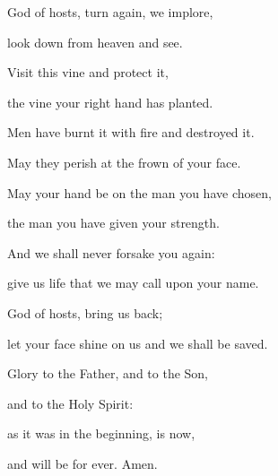 \noindent God of hosts, turn again, we implore,~\GreStar{}~\nopagebreak

look down from heaven and see.

\noindent Visit this vine and protect it,~\GreStar{}~\nopagebreak

the vine your right hand has planted.

\noindent Men have burnt it with fire and destroyed it.~\GreStar{}~\nopagebreak

May they perish at the frown of your face.

\noindent May your hand be on the man you have chosen,~\GreStar{}~\nopagebreak

the man you have given your strength.

\noindent And we shall never forsake you again:~\GreStar{}~\nopagebreak

give us life that we may call upon your name.

\noindent God of hosts, bring us back;~\GreStar{}~\nopagebreak

let your face shine on us and we shall be saved.

\noindent Glory to the Father, and to the Son,~\GreStar{}~\nopagebreak

and to the Holy Spirit:

\noindent as it was in the beginning, is now,~\GreStar{}~\nopagebreak

and will be for ever. Amen.
